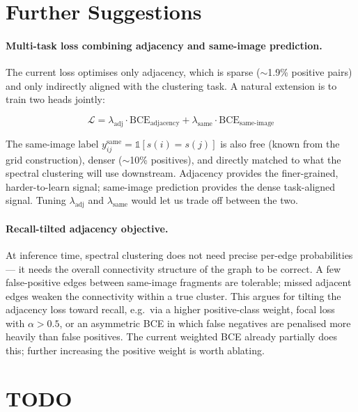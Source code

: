 \documentclass[12pt, a4paper]{article}
\begin{document}
\section{Further Suggestions}

\paragraph{Multi-task loss combining adjacency and same-image prediction.}
The current loss optimises only adjacency, which is sparse ($\sim$1.9\% positive pairs)
and only indirectly aligned with the clustering task. A natural extension is to train
two heads jointly:

\[
\mathcal{L} = \lambda_{\text{adj}} \cdot \text{BCE}_{\text{adjacency}}
            + \lambda_{\text{same}} \cdot \text{BCE}_{\text{same-image}}
\]

The same-image label $y^{\text{same}}_{ij} = \mathbb{1}[s(i) = s(j)]$ is also free
(known from the grid construction), denser ($\sim$10\% positives), and directly
matched to what the spectral clustering will use downstream. Adjacency provides the
finer-grained, harder-to-learn signal; same-image prediction provides the dense
task-aligned signal. Tuning $\lambda_{\text{adj}}$ and $\lambda_{\text{same}}$ would
let us trade off between the two.

\paragraph{Recall-tilted adjacency objective.}
At inference time, spectral clustering does not need precise per-edge probabilities —
it needs the overall connectivity structure of the graph to be correct. A few
false-positive edges between same-image fragments are tolerable; missed adjacent edges
weaken the connectivity within a true cluster. This argues for tilting the adjacency
loss toward recall, e.g.\ via a higher positive-class weight, focal loss with
$\alpha > 0.5$, or an asymmetric BCE in which false negatives are penalised more
heavily than false positives. The current weighted BCE already partially does this;
further increasing the positive weight is worth ablating.

\section*{TODO}
\end{document}
